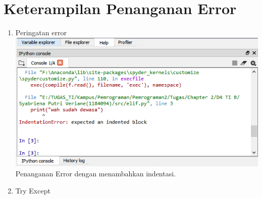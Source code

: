 \section{Keterampilan Penanganan Error}
\begin{enumerate}
\item Peringatan error\\

\includegraphics{gambar/error.png}
Penanganan Error dengan menambahkan indentasi.

\item Try Except\\

\end{enumerate}
